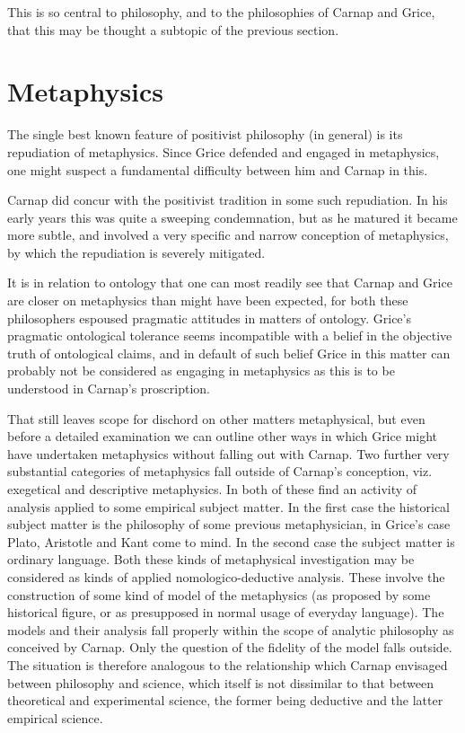\documentclass[10pt,titlepage]{book}
\begin{document}
This is so central to philosophy, and to the philosophies of Carnap and Grice, that this may be thought a subtopic of the previous section.

\section{Metaphysics}

The single best known feature of positivist philosophy (in general) is its repudiation of metaphysics.
Since Grice defended and engaged in metaphysics, one might suspect a fundamental difficulty between him and Carnap in this.

Carnap did concur with the positivist tradition in some such repudiation.
In his early years this was quite a sweeping condemnation, but as he matured it became more subtle, and involved a very specific and narrow conception of metaphysics, by which the repudiation is severely mitigated.

It is in relation to ontology that one can most readily see that Carnap and Grice are closer on metaphysics than might have been expected, for both these philosophers espoused pragmatic attitudes in matters of ontology.
Grice's pragmatic ontological tolerance seems incompatible with a belief in the objective truth of ontological claims, and in default of such belief Grice in this matter can probably not be considered as engaging in metaphysics as this is to be understood in Carnap's proscription.

That still leaves scope for dischord on other matters metaphysical, but even before a detailed examination we can outline other ways in which Grice might have undertaken metaphysics without falling out with Carnap.
Two further very substantial categories of metaphysics fall outside of Carnap's conception, viz. exegetical and descriptive metaphysics.
In both of these find an activity of analysis applied to some empirical subject matter.
In the first case the historical subject matter is the philosophy of some previous metaphysician, in Grice's case Plato, Aristotle and Kant come to mind.
In the second case the subject matter is ordinary language.
Both these kinds of metaphysical investigation may be considered as kinds of applied nomologico-deductive analysis.
These involve the construction of some kind of model of the metaphysics (as proposed by some historical figure, or as presupposed in normal usage of everyday language).
The models and their analysis fall properly within the scope of analytic philosophy as conceived by Carnap.
Only the question of the fidelity of the model falls outside.
The situation is therefore analogous to the relationship which Carnap envisaged between philosophy and science, which itself is not dissimilar to that between theoretical and experimental science, the former being deductive and the latter empirical science.
\end{document}

